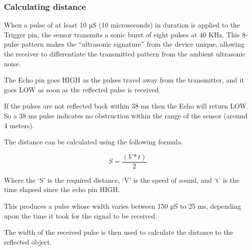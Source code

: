 \documentclass[12pt]{article}
\begin{document}
\subsubsection*{Calculating distance}

When a pulse of at least 10 µS (10 microseconds) in duration is applied to the Trigger pin, the sensor transmits a sonic burst of eight pulses at 40 KHz. This 8-pulse pattern makes the “ultrasonic signature” from the device unique, allowing the receiver to differentiate the transmitted pattern from the ambient ultrasonic noise.

 The Echo pin goes HIGH as the pulses travel away from the transmitter, and it goes LOW as soon as the reflected pulse is received. 

If the pulses are not reflected back within 38 ms then the Echo will return LOW. So a 38 ms pulse indicates no obstruction within the range of the sensor (around 4 meters).

The distance can be calculated using the following formula.

\[S = \frac{(V*t)}{2}\]

Where the ‘S’ is the required distance, ‘V’ is the speed of sound, and ‘t’ is the time elapsed since the echo pin HIGH.

 This produces a pulse whose width varies between 150 µS to 25 ms, depending upon the time it took for the signal to be received.

The width of the received pulse is then used to calculate the distance to the reflected object.
\end{document}
